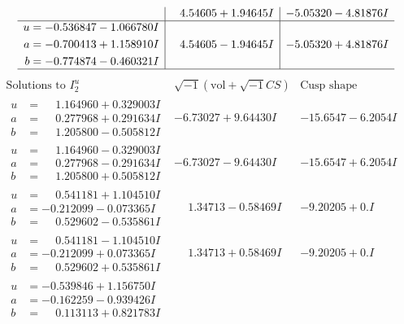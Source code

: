 \documentclass[1p]{elsarticle_modified}
\theoremstyle{definition}
\newcommand{\I}{\sqrt{-1}}
\begin{document}
$$\begin{array}{c|c|c}
 & \phantom{-}4.54605 + 1.94645 I & -5.05320 - 4.81876 I \\ \hline\begin{aligned}
u &= -0.536847 - 1.066780 I \\
a &= -0.700413 + 1.158910 I \\
b &= -0.774874 - 0.460321 I\end{aligned}
 & \phantom{-}4.54605 - 1.94645 I & -5.05320 + 4.81876 I\\
 \hline 
 \end{array}$$\newpage$$\begin{array}{c|c|c}  
\text{Solutions to }I^u_{2}& \I (\text{vol} + \sqrt{-1}CS) & \text{Cusp shape}\\
 \hline 
\begin{aligned}
u &= \phantom{-}1.164960 + 0.329003 I \\
a &= \phantom{-}0.277968 + 0.291634 I \\
b &= \phantom{-}1.205800 - 0.505812 I\end{aligned}
 & -6.73027 + 9.64430 I & -15.6547 - 6.2054 I \\ \hline\begin{aligned}
u &= \phantom{-}1.164960 - 0.329003 I \\
a &= \phantom{-}0.277968 - 0.291634 I \\
b &= \phantom{-}1.205800 + 0.505812 I\end{aligned}
 & -6.73027 - 9.64430 I & -15.6547 + 6.2054 I \\ \hline\begin{aligned}
u &= \phantom{-}0.541181 + 1.104510 I \\
a &= -0.212099 - 0.073365 I \\
b &= \phantom{-}0.529602 - 0.535861 I\end{aligned}
 & \phantom{-}1.34713 - 0.58469 I & -9.20205 + 0. I\phantom{ +0.000000I} \\ \hline\begin{aligned}
u &= \phantom{-}0.541181 - 1.104510 I \\
a &= -0.212099 + 0.073365 I \\
b &= \phantom{-}0.529602 + 0.535861 I\end{aligned}
 & \phantom{-}1.34713 + 0.58469 I & -9.20205 + 0. I\phantom{ +0.000000I} \\ \hline\begin{aligned}
u &= -0.539846 + 1.156750 I \\
a &= -0.162259 - 0.939426 I \\
b &= \phantom{-}0.113113 + 0.821783 I\end{aligned}

\end{array}$$
\end{document}
